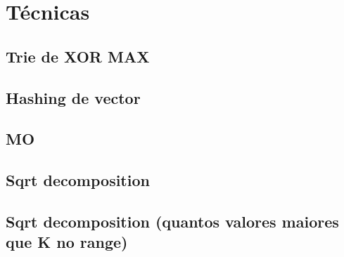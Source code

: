\section{Técnicas}

\subsection{Trie de XOR MAX}


\subsection{Hashing de vector}


\subsection{MO}


\subsection{Sqrt decomposition}


\subsection{Sqrt decomposition (quantos valores maiores que K no range)}

